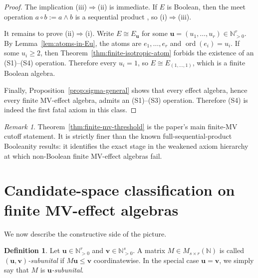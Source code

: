 \documentclass[11pt]{article}
\theoremstyle{definition}
\newtheorem{definition}[theorem]{Definition}
\theoremstyle{remark}
\newtheorem{remark}[theorem]{Remark}
\numberwithin{equation}{section}
\newcommand{\NN}{\mathbb{N}}
\newcommand{\ord}{\operatorname{ord}}
\begin{document}
\begin{proof}
The implication \textup{(iii)}$\Rightarrow$\textup{(ii)} is immediate. If $E$ is Boolean, then the meet operation $a\circ b:=a\wedge b$ is a sequential product \cite{GudderGreechie2002}, so \textup{(i)}$\Rightarrow$\textup{(iii)}.

It remains to prove \textup{(ii)}$\Rightarrow$\textup{(i)}. Write $E\cong E_{\mathbf u}$ for some $\mathbf u=(u_1,\dots,u_r)\in\NN_{>0}^r$. By Lemma~\ref{lem:atoms-in-Eu}, the atoms are $e_1,\dots,e_r$ and $\ord(e_i)=u_i$. If some $u_i\ge 2$, then Theorem~\ref{thm:finite-isotropic-atom} forbids the existence of an \textup{(S1)}--\textup{(S4)} operation. Therefore every $u_i=1$, so $E\cong E_{(1,\dots,1)}$, which is a finite Boolean algebra.

Finally, Proposition~\ref{prop:sigma-general} shows that every effect algebra, hence every finite MV-effect algebra, admits an \textup{(S1)}--\textup{(S3)} operation. Therefore \textup{(S4)} is indeed the first fatal axiom in this class.
\end{proof}

\begin{remark}
Theorem~\ref{thm:finite-mv-threshold} is the paper's main finite-MV cutoff statement. It is strictly finer than the known full-sequential-product Booleanity results: it identifies the exact stage in the weakened axiom hierarchy at which non-Boolean finite MV-effect algebras fail.
\end{remark}

\section{Candidate-space classification on finite MV-effect algebras}\label{sec:classification}
We now describe the constructive side of the picture.

\begin{definition}
Let $\mathbf u\in\NN_{>0}^r$ and $\mathbf v\in\NN_{>0}^s$. A matrix $M\in M_{s\times r}(\NN)$ is called \emph{$(\mathbf u,\mathbf v)$-subunital} if $M\mathbf u\le \mathbf v$ coordinatewise. In the special case $\mathbf u=\mathbf v$, we simply say that $M$ is \emph{$\mathbf u$-subunital}.
\end{definition}
\end{document}
